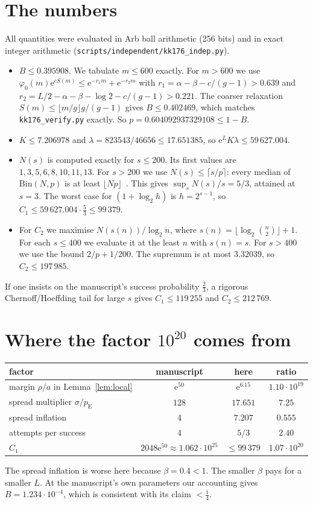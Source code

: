 \documentclass[11pt]{amsart}
\theoremstyle{remark}
\newcommand{\pE}{p_{\mathrm E}}
\newcommand{\ee}{\mathrm e}
\begin{document}
\section{The numbers}
All quantities were evaluated in Arb ball arithmetic (256 bits) and in
exact integer arithmetic (\texttt{scripts/independent/kk176\_indep.py}).
\begin{itemize}
\item $B\le0.395908$. We tabulate $m\le600$ exactly. For $m>600$ we use
$\varphi_0(m)\ee^{cS(m)}\le\ee^{-r_1m}+\ee^{-r_2m}$ with
$r_1=\alpha-\beta-c/(g-1)>0.639$ and
$r_2=L/2-\alpha-\beta-\log2-c/(g-1)>0.221$. The coarser relaxation
$S(m)\le\lfloor m/g\rfloor g/(g-1)$ gives $B\le0.402469$, which matches
\texttt{kk176\_verify.py} exactly. So $p=0.604092937329108\le1-B$.
\item $K\le7.206978$ and $\lambda=823543/46656\le17.651385$, so
$\ee^LK\lambda\le59\,627.004$.
\item $N(s)$ is computed exactly for $s\le200$. Its first values are $1,3,5,6,8,10,11,13$.
For $s>200$ we use $N(s)\le\lceil s/p\rceil$: every median of
$\mathrm{Bin}(N,p)$ is at least $\lfloor Np\rfloor$~\cite{KaasBuhrman}.
This gives $\sup_sN(s)/s=5/3$, attained at $s=3$.
The worst case for $(1+\log_2h)$ is $h=2^{s-1}$, so $C_1\le59\,627.004\cdot\frac53\le99\,379$.
\item For $C_2$ we maximise $N(s(n))/\log_2n$, where $s(n)=\lfloor\log_2\binom n2\rfloor+1$.
For each $s\le400$ we evaluate it at the least $n$ with $s(n)=s$. For
$s>400$ we use the bound $2/p+1/200$. The supremum is at most $3.32039$, so
$C_2\le197\,985$.
\end{itemize}
If one insists on the manuscript's success probability $\frac23$, a
rigorous Chernoff/Hoeffding tail for large $s$ gives $C_1\le119\,255$ and
$C_2\le212\,769$.

\section{Where the factor $10^{20}$ comes from}
\begin{center}
\begin{tabular}{lccc}
\toprule
factor & manuscript & here & ratio\\
\midrule
margin $\rho/a$ in Lemma~\ref{lem:local} & $\ee^{50}$ & $\ee^{6.15}$ & $1.10\cdot10^{19}$\\
spread multiplier $\sigma/\pE$ & $128$ & $17.651$ & $7.25$\\
spread inflation & $4$ & $7.207$ & $0.555$\\
attempts per success & $4$ & $5/3$ & $2.40$\\
\midrule
$C_1$ & $2048\ee^{50}\approx1.062\cdot10^{25}$ & $\le 99\,379$ & $1.07\cdot10^{20}$\\
\bottomrule
\end{tabular}
\end{center}
The spread inflation is worse here because $\beta=0.4<1$. The smaller $\beta$
pays for a smaller $L$. At the manuscript's own parameters our accounting
gives $B=1.234\cdot10^{-4}$, which is consistent with its claim $<\frac14$.
\end{document}
